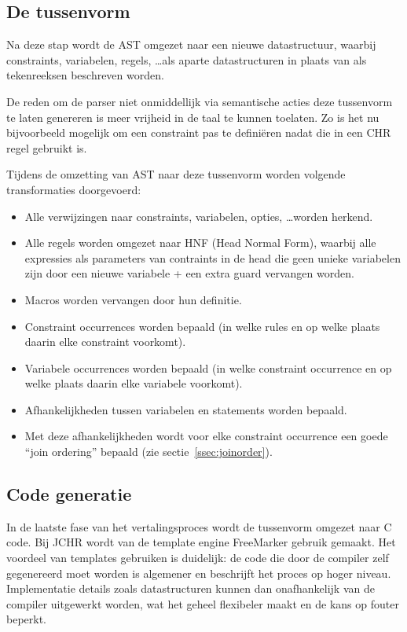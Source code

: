 \subsection{De tussenvorm} \label{sec:tussenvorm}

Na deze stap wordt de AST omgezet naar een nieuwe datastructuur, waarbij constraints, variabelen, regels, \ldots als aparte datastructuren in plaats van als tekenreeksen beschreven worden. 

De reden om de parser niet onmiddellijk via semantische acties deze tussenvorm te laten genereren is meer vrijheid in de taal te kunnen toelaten. Zo is het nu bijvoorbeeld mogelijk om een constraint pas te defini\"eren nadat die in een CHR regel gebruikt is.

Tijdens de omzetting van AST naar deze tussenvorm worden volgende transformaties doorgevoerd: \begin{itemize}
\item Alle verwijzingen naar constraints, variabelen, opties, \ldots worden herkend.
\item Alle regels worden omgezet naar HNF (Head Normal Form), waarbij alle expressies als parameters van contraints in de head die geen unieke variabelen zijn door een nieuwe variabele + een extra guard vervangen worden.
\item Macros worden vervangen door hun definitie.
\item Constraint occurrences worden bepaald (in welke rules en op welke plaats daarin elke constraint voorkomt).
\item Variabele occurrences worden bepaald (in welke constraint occurrence en op welke plaats daarin elke variabele voorkomt).
\item Afhankelijkheden tussen variabelen en statements worden bepaald.
\item Met deze afhankelijkheden wordt voor elke constraint occurrence een goede ``join ordering'' bepaald (zie sectie~\ref{ssec:joinorder}).
\end{itemize}

\subsection{Code generatie} \label{sec:codegen}

In de laatste fase van het vertalingsproces wordt de tussenvorm omgezet naar C code. Bij JCHR wordt van de template engine FreeMarker gebruik gemaakt. Het voordeel van templates gebruiken is duidelijk: de code die door de compiler zelf gegenereerd moet worden is algemener en beschrijft het proces op hoger niveau. Implementatie details zoals datastructuren kunnen dan onafhankelijk van de compiler uitgewerkt worden, wat het geheel flexibeler maakt en de kans op fouter beperkt.

